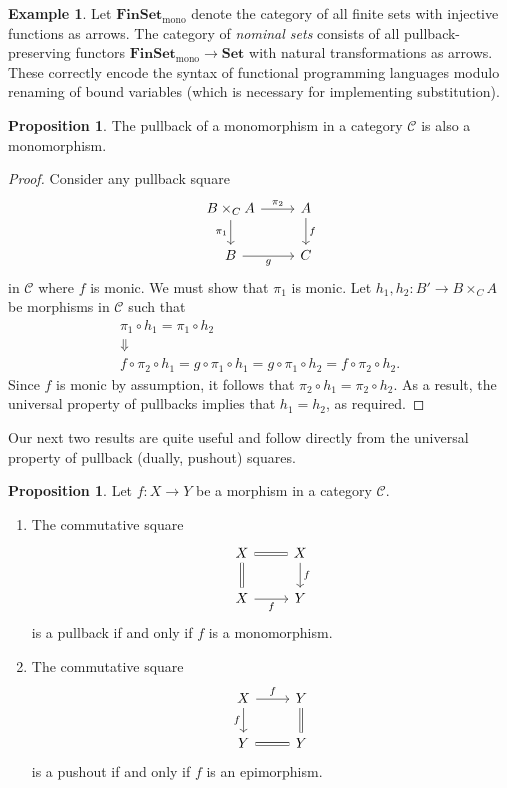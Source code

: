 \documentclass[10pt,letterpaper,cm]{nupset}
\theoremstyle{definition}
\newtheorem{exmp}[definition]{Example}
\theoremstyle{theorem}
\newtheorem{prop}[definition]{Proposition}
\theoremstyle{remark}
\newcommand{\1}{\mathbf{1}}
\renewcommand{\c}{\mathscr{C}}
\newcommand{\0}{\vec 0}
\begin{document}
\begin{exmp}
Let $\mathbf{FinSet}_{\mathrm{mono}}$ denote the category of all finite sets with injective functions as arrows. The category of \textit{nominal sets} consists of all pullback-preserving functors  $\mathbf{FinSet}_{\mathrm{mono}}\to \mathbf{Set}$ with natural transformations as arrows. These correctly encode the syntax of functional programming languages modulo renaming of bound variables (which is necessary for implementing substitution).
\end{exmp}


\begin{prop}
The pullback of a monomorphism in a category $\c$ is also a monomorphism.
\end{prop}
\begin{proof}
Consider any pullback square
\[
\begin{tikzcd}
B\times_C A \arrow[r, "\pi_2"] \arrow[d, "\pi_1"'] & A \arrow[d, "f"] \\
B \arrow[r, "g"']                                  & C               
\end{tikzcd}
\] in $\c$ where $f$ is monic. We must show that $\pi_1$ is monic. Let $h_1, h_2 : B' \to B\times_CA$ be morphisms in $\c$ such that 
\begin{gather*}
\pi_1 \circ h_1 = \pi_1 \circ h_2
\\ \Downarrow
\\ f\circ \pi_2 \circ h_1 = g\circ \pi_1 \circ h_1 = g\circ \pi_1 \circ h_2 = f\circ \pi_2 \circ h_2.
\end{gather*} Since $f$ is monic by assumption, it follows that $\pi_2 \circ h_1 = \pi_2 \circ h_2$. As a result, the universal property of pullbacks implies that $h_1 = h_2$, as required. 
\end{proof}

\smallskip

Our next two results are quite useful and follow directly from the universal property of pullback (dually, pushout) squares.

\begin{prop} Let $f: X \to Y$ be a morphism in a category $\c$.
\begin{enumerate}
\item  The commutative square
\[
\begin{tikzcd}
X \arrow[r, equal] \arrow[d, equal] & X \arrow[d, "f"] \\
X \arrow[r, "f"']     & Y               
\end{tikzcd}
\] is a pullback if and only if $f$ is a monomorphism.
\item The commutative square
\[
\begin{tikzcd}
X \arrow[d, "f"'] \arrow[r, "f"] & Y \arrow[d, equal] \\
Y \arrow[r, equal]                      & Y          
\end{tikzcd}
\] is a pushout if and only if $f$ is an epimorphism.
\end{enumerate}
\end{prop}
\end{document}
